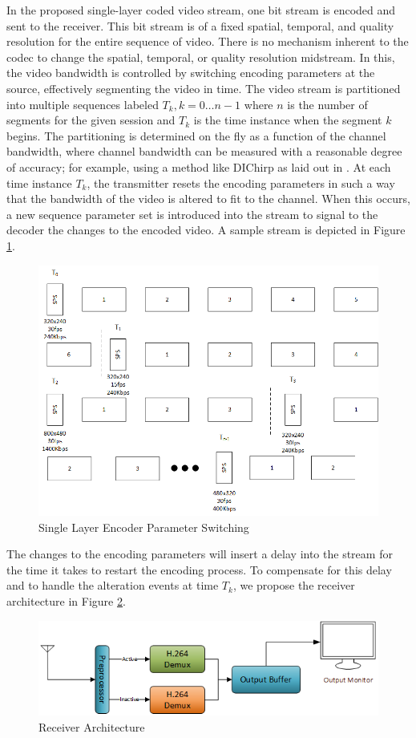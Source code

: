 In the proposed single-layer coded video stream, one bit stream is encoded and sent to the receiver. This bit stream is of a fixed spatial, temporal, and quality resolution for the entire sequence of video. There is no mechanism inherent to the codec to change the spatial, temporal, or quality resolution midstream. In this, the video bandwidth is controlled by switching encoding parameters at the source, effectively segmenting the video in time. The video stream is partitioned into multiple sequences labeled $T_k,k=0\ldots{n-1}$ where $n$ is the number of segments for the given session and $T_k$ is the time instance when the segment $k$ begins. The partitioning is determined on the fly as a function of the channel bandwidth, where channel bandwidth can be measured with a reasonable degree of accuracy; for example, using a method like DIChirp as laid out in \cite{DIChirp}. At each time instance $T_k$, the transmitter resets the encoding parameters in such a way that the bandwidth of the video is altered to fit to the channel. When this occurs, a new sequence parameter set is introduced into the stream to signal to the decoder the changes to the encoded video. A sample stream is depicted in Figure \ref{fig:SingleLayerSwitching}.
\begin{figure}[ht]
\centering
\includegraphics[width=0.75\linewidth]{images/SingleLayerParameterSwitching.png}
\caption{Single Layer Encoder Parameter Switching}
\label{fig:SingleLayerSwitching}
\end{figure}
The changes to the encoding parameters will insert a delay into the stream for the time it takes to restart the encoding process. To compensate for this delay and to handle the alteration events at time $T_k$, we propose the receiver architecture in Figure \ref{fig:ReceiverArchitecture}.
\begin{figure}[ht]
\centering
\includegraphics[width=0.6\linewidth]{images/ReceiverArchitecture.png}
\caption{Receiver Architecture}
\label{fig:ReceiverArchitecture}
\end{figure}
